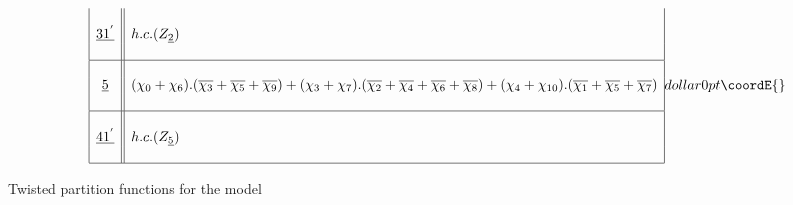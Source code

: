 \documentclass[a4paper,11pt]{article}
\providecommand{\ch}[1]{\chi_{#1}}
\providecommand{\och}[1]{\overline{\chi_{#1}}}
\providecommand{\ud}[1]{\underline{#1}}
\begin{document}
\begin{table}
$${\begin{array}{|c||l|}
{}  &  {}  \\
\ud{31^{'}} & h.c. (Z_{\ud2}) \\
{}  &  {}  \\
\hline
{}  &  {}  \\
\ud5  & (\ch{0} + \ch{6}).(\och{3} + \och{5} + \och{9})
+  (\ch{3} + \ch{7}).(\och{2} + \och{4} + \och{6} + \och{8})
+  (\ch{4} + \ch{10}).(\och{1} + \och{5} + \och{7})  \\
{}  &  {}  \\
\hline
{}  &  {}  \\
\ud{41^{'}} & h.c. (Z_{\ud5}) \\
{}  &  {}  \\
\hline
\end{array}
}{dollar}{0pt}\coordE{}$$
\normalsize
\caption{Twisted partition functions for the \coordHE{} model}
\end{table}




\end{document}
